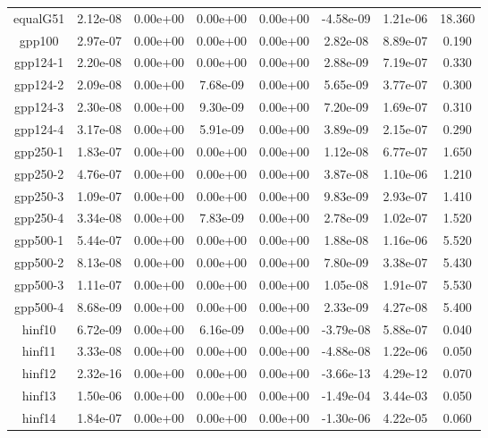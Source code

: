 {{\begin{table}[h]
\begin{center}
{\begin{tabular}{cccccccc}
            equalG51 & 2.12e-08 & 0.00e+00 & 0.00e+00 & 0.00e+00 & -4.58e-09 & 1.21e-06 & 18.360 \\ 
              gpp100 & 2.97e-07 & 0.00e+00 & 0.00e+00 & 0.00e+00 & 2.82e-08 & 8.89e-07 & 0.190 \\ 
            gpp124-1 & 2.20e-08 & 0.00e+00 & 0.00e+00 & 0.00e+00 & 2.88e-09 & 7.19e-07 & 0.330 \\ 
            gpp124-2 & 2.09e-08 & 0.00e+00 & 7.68e-09 & 0.00e+00 & 5.65e-09 & 3.77e-07 & 0.300 \\ 
            gpp124-3 & 2.30e-08 & 0.00e+00 & 9.30e-09 & 0.00e+00 & 7.20e-09 & 1.69e-07 & 0.310 \\ 
            gpp124-4 & 3.17e-08 & 0.00e+00 & 5.91e-09 & 0.00e+00 & 3.89e-09 & 2.15e-07 & 0.290 \\ 
            gpp250-1 & 1.83e-07 & 0.00e+00 & 0.00e+00 & 0.00e+00 & 1.12e-08 & 6.77e-07 & 1.650 \\ 
            gpp250-2 & 4.76e-07 & 0.00e+00 & 0.00e+00 & 0.00e+00 & 3.87e-08 & 1.10e-06 & 1.210 \\ 
            gpp250-3 & 1.09e-07 & 0.00e+00 & 0.00e+00 & 0.00e+00 & 9.83e-09 & 2.93e-07 & 1.410 \\ 
            gpp250-4 & 3.34e-08 & 0.00e+00 & 7.83e-09 & 0.00e+00 & 2.78e-09 & 1.02e-07 & 1.520 \\ 
            gpp500-1 & 5.44e-07 & 0.00e+00 & 0.00e+00 & 0.00e+00 & 1.88e-08 & 1.16e-06 & 5.520 \\ 
            gpp500-2 & 8.13e-08 & 0.00e+00 & 0.00e+00 & 0.00e+00 & 7.80e-09 & 3.38e-07 & 5.430 \\ 
            gpp500-3 & 1.11e-07 & 0.00e+00 & 0.00e+00 & 0.00e+00 & 1.05e-08 & 1.91e-07 & 5.530 \\ 
            gpp500-4 & 8.68e-09 & 0.00e+00 & 0.00e+00 & 0.00e+00 & 2.33e-09 & 4.27e-08 & 5.400 \\ 
              hinf10 & 6.72e-09 & 0.00e+00 & 6.16e-09 & 0.00e+00 & -3.79e-08 & 5.88e-07 & 0.040 \\ 
              hinf11 & 3.33e-08 & 0.00e+00 & 0.00e+00 & 0.00e+00 & -4.88e-08 & 1.22e-06 & 0.050 \\ 
              hinf12 & 2.32e-16 & 0.00e+00 & 0.00e+00 & 0.00e+00 & -3.66e-13 & 4.29e-12 & 0.070 \\ 
              hinf13 & 1.50e-06 & 0.00e+00 & 0.00e+00 & 0.00e+00 & -1.49e-04 & 3.44e-03 & 0.050 \\ 
              hinf14 & 1.84e-07 & 0.00e+00 & 0.00e+00 & 0.00e+00 & -1.30e-06 & 4.22e-05 & 0.060 \\ 

\end{tabular}}
\end{center}
\end{table}}}
